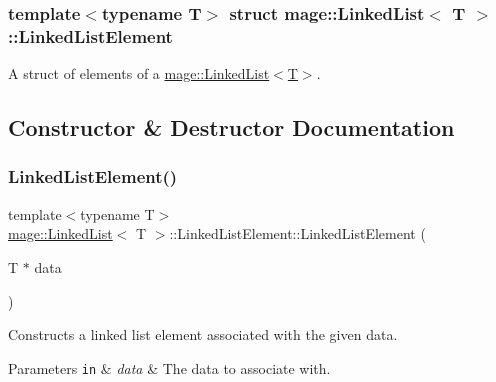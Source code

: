 \subsubsection*{template$<$typename T$>$\newline
struct mage\+::\+Linked\+List$<$ T $>$\+::\+Linked\+List\+Element}

A struct of elements of a \hyperlink{classmage_1_1_linked_list}{mage\+::\+Linked\+List$<$\+T$>$}. 

\subsection{Constructor \& Destructor Documentation}
\hypertarget{structmage_1_1_linked_list_1_1_linked_list_element_a7bb2d9bd1aef7790f675a09a607f4160}{}\label{structmage_1_1_linked_list_1_1_linked_list_element_a7bb2d9bd1aef7790f675a09a607f4160} 
\subsubsection{\texorpdfstring{Linked\+List\+Element()}{LinkedListElement()}}
{\footnotesize\ttfamily template$<$typename T$>$ \\
\hyperlink{classmage_1_1_linked_list}{mage\+::\+Linked\+List}$<$ T $>$\+::Linked\+List\+Element\+::\+Linked\+List\+Element (\begin{DoxyParamCaption}\item[{T $\ast$}]{data }\end{DoxyParamCaption})}

Constructs a linked list element associated with the given data.


\begin{DoxyParams}[1]{Parameters}
\mbox{\tt in}  & {\em data} & The data to associate with. \\
\hline
\end{DoxyParams}
\hypertarget{structmage_1_1_linked_list_1_1_linked_list_element_a89ff38c90ddf8854abb821d1497e8e1c}{}\label{structmage_1_1_linked_list_1_1_linked_list_element_a89ff38c90ddf8854abb821d1497e8e1c} 
